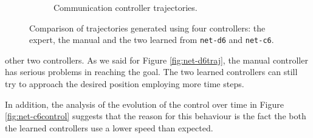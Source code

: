 \begin{figure}[!htb]
\begin{center}
\begin{subfigure}[h]{0.49\textwidth}
			\caption{Communication controller trajectories.}
		\end{subfigure}
	\end{center}
	\caption[Evaluation of the trajectories learned by \texttt{net-c6}.]{Comparison 
	of trajectories generated using four controllers: the 
	expert, the manual and the two learned from \texttt{net-d6} and 
	\texttt{net-c6}.}
	\label{fig:net-c6traj}
\end{figure}

\noindent
 other two controllers. As we said for Figure \ref{fig:net-d6traj}, the manual 
 controller has serious  problems in reaching the goal. The two learned controllers 
 can still try to approach the desired position employing more time steps.

In addition, the analysis of the evolution of the control over time in Figure 
\ref{fig:net-c6control} suggests that the reason for this behaviour is the fact the 
both the learned controllers use a lower speed than expected.
